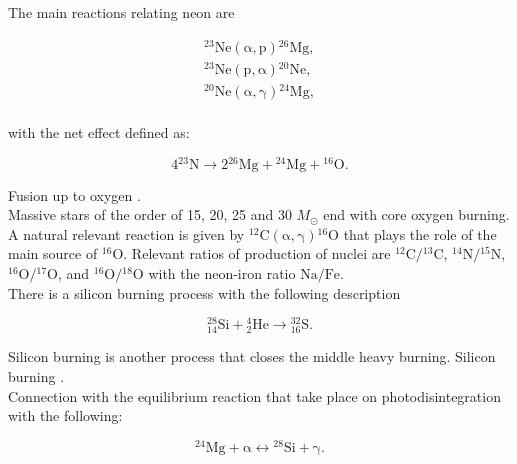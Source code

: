 \documentclass[openany]{book}
\begin{document}
 The main reactions relating neon are 
 
 \begin{equation}\label{eq:reaction_neon_processes}
	\begin{split}
		\mathrm{{}^{23}Ne(\alpha, p){}^{26}Mg}, \\
		\mathrm{{}^{23}Ne(p, \alpha){}^{20}Ne}, \\
		\mathrm{{}^{20}Ne(\alpha, \gamma){}^{24}Mg}, \\
	\end{split}
 \end{equation}

with the net effect defined as: 

\begin{equation}\label{eq:reaction_neon_net}
	 \mathrm{4{}^{23}N \rightarrow 2 {}^{26}Mg + {}^{24}Mg + {}^{16}O}.
\end{equation}



Fusion up to oxygen \cite{eleid_meyer_the_2004}.\\ 

Massive stars of the order of 15, 20, 25 and 30 $M_{\odot}$
end with core oxygen burning. A natural relevant reaction is given by $\mathrm{{}^{12}C(\alpha, \gamma){}^{16}O}$ that plays the role of the main source of $\mathrm{{}^{16}O}$. Relevant ratios of production of nuclei are $\mathrm{{}^{12}C/{}^{13}C}$, $\mathrm{{}^{14}N/{}^{15}N}$, $\mathrm{{}^{16}O/{}^{17}O}$, and $\mathrm{{}^{16}O/{}^{18}O}$ with the neon-iron ratio $\mathrm{Na/Fe}$. \\

There is a silicon burning process with the following description 

\begin{equation} \label{eq:reaction_28Sialpha}
	\mathrm{{}^{28}_{14}Si +{}^{4}_{2}He \rightarrow {}^{32}_{16}S}.
\end{equation}

Silicon burning is another process that closes the middle heavy burning. Silicon burning \cite{bodansky_clayton_fowler_1968}.   \\


Connection with the equilibrium reaction that take place on photodisintegration with the following:

\begin{equation}\label{eq:reaction_Si_equillibrium}
	\mathrm{{}^{24}Mg + \alpha \leftrightarrow {}^{28}Si + \gamma}.
\end{equation}
\end{document}
